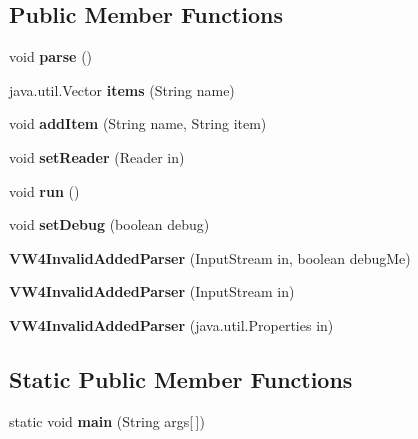 \subsection*{Public Member Functions}
\begin{DoxyCompactItemize}
\item 
void {\bf parse} ()
\item 
java.\+util.\+Vector {\bf items} (String name)
\item 
void {\bf add\+Item} (String name, String item)
\item 
void {\bf set\+Reader} (Reader in)
\item 
void {\bf run} ()
\item 
void {\bf set\+Debug} (boolean debug)
\item 
{\bf V\+W4\+Invalid\+Added\+Parser} (Input\+Stream in, boolean debug\+Me)
\item 
{\bf V\+W4\+Invalid\+Added\+Parser} (Input\+Stream in)
\item 
{\bf V\+W4\+Invalid\+Added\+Parser} (java.\+util.\+Properties in)
\end{DoxyCompactItemize}
\subsection*{Static Public Member Functions}
\begin{DoxyCompactItemize}
\item 
static void {\bf main} (String args[$\,$])
\end{DoxyCompactItemize}
